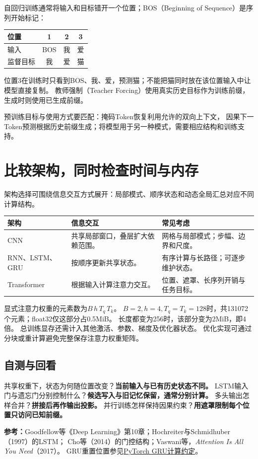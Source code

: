自回归训练通常将输入和目标错开一个位置；BOS（Beginning of Sequence）是序列开始标记：
\begin{center}
\begin{tabular}{lccc}
\toprule
位置 & 1 & 2 & 3\\
\midrule
输入 & BOS & 我 & 爱\\
监督目标 & 我 & 爱 & 猫\\
\bottomrule
\end{tabular}
\end{center}
位置3在训练时只看到BOS、我、爱，预测猫；不能把猫同时放在该位置输入中让模型直接复制。
教师强制（Teacher Forcing）使用真实历史目标作为训练前缀，生成时则使用已生成前缀。

预训练目标与使用方式要匹配：掩码Token恢复利用允许的双向上下文，
因果下一Token预测根据历史前缀生成；将模型用于另一种模式，需要相应结构和训练支持。

\section{比较架构，同时检查时间与内存}
\label{sec:seq-compare}
架构选择可围绕信息交互方式展开：局部模式、顺序状态和动态全局汇总对应不同计算结构。

\begin{center}
\begin{tabularx}{\textwidth}{P{23mm}P{50mm}Y}
\toprule
架构 & 信息交互 & 常见考虑\\
\midrule
CNN & 共享局部窗口，叠层扩大依赖范围。 & 网格与局部模式；步幅、边界和尺度。\\
RNN、LSTM、GRU & 按顺序更新共享状态。 & 有序计算与长路径；可逐步维护状态。\\
Transformer & 根据输入计算注意力交互。 & 位置、遮罩、长序列开销与任务目标。\\
\bottomrule
\end{tabularx}
\end{center}

显式注意力权重的元素数为$B\,h\,T_q\,T_k$。
$B=2,h=4,T_q=T_k=128$时，共131072个元素；float32仅这部分占0.5MiB。
长度都变为256时，该部分变为2MiB，即4倍。
总训练显存还需计入其他激活、参数、梯度及优化器状态。
优化实现可通过分块或重计算避免完整保存注意力权重矩阵。

\subsection{自测与回看}
共享权重下，状态为何随位置改变？\textbf{当前输入与已有历史状态不同。}
LSTM输入门与遗忘门分别控制什么？\textbf{候选写入与旧记忆保留，通常分别计算。}
多头输出怎样合并？\textbf{拼接后再作输出投影。}
并行训练怎样保持因果约束？\textbf{用遮罩限制每个位置只访问已知前缀。}

\begingroup\small
\noindent\textbf{参考：}Goodfellow等《Deep Learning》第10章；Hochreiter与Schmidhuber（1997）的LSTM；
Cho等（2014）的门控结构；Vaswani等，\textit{Attention Is All You Need}（2017）。
GRU重置位置参见\href{https://docs.pytorch.org/docs/stable/generated/torch.nn.GRU.html}{PyTorch GRU计算约定}。
\par\endgroup
